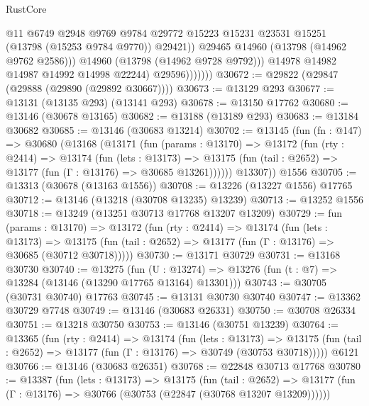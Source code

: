 \begin{lexlean}{RustCore}
\begin{coremodule}
                            @11
                            @6749
                            @2948
                            @9769
                            @9784
                            @29772
                            @15223
                            @15231
                            @23531
                            @15251
                            (@13798 (@15253 @9784 @9770))
                            @29421))
                        @29465
                        @14960
                        (@13798 (@14962 @9762 @2586)))
                      @14960
                      (@13798 (@14962 @9728 @9792)))
                    @14978
                    @14982
                    @14987
                    @14992
                    @14998
                    @22244)
                  @29596)))))))
@30672 := @29822 (@29847 (@29888 (@29890 (@29892 @30667))))
@30673 := @13129 @293
@30677 := @13131 (@13135 @293) (@13141 @293)
@30678 := @13150 @17762
@30680 := @13146 (@30678 @13165)
@30682 := @13188 (@13189 @293)
@30683 := @13184 @30682
@30685 := @13146 (@30683 @13214)
@30702 := @13145
    (fun (fn : @147) =>
    @30680
      (@13168
        (@13171
          (fun (params : @13170) =>
          @13172
            (fun (rty : @2414) =>
            @13174
              (fun (lets : @13173) =>
              @13175 (fun (tail : @2652) => @13177 (fun (Γ : @13176) => @30685 @13261))))))
        @13307))
    @1556
@30705 := @13313 (@30678 (@13163 @1556))
@30708 := @13226 (@13227 @1556) @17765
@30712 := @13146 (@13218 (@30708 @13235) @13239)
@30713 := @13252 @1556
@30718 := @13249 (@13251 @30713 @17768 @13207 @13209)
@30729 := fun (params : @13170) =>
  @13172
    (fun (rty : @2414) =>
    @13174
      (fun (lets : @13173) =>
      @13175 (fun (tail : @2652) => @13177 (fun (Γ : @13176) => @30685 (@30712 @30718)))))
@30730 := @13171 @30729
@30731 := @13168 @30730
@30740 := @13275
    (fun (U : @13274) => @13276 (fun (t : @7) => @13284 (@13146 (@13290 @17765 @13164) @13301)))
@30743 := @30705 (@30731 @30740) @17763
@30745 := @13131 @30730 @30740
@30747 := @13362 @30729 @7748
@30749 := @13146 (@30683 @26331)
@30750 := @30708 @26334
@30751 := @13218 @30750
@30753 := @13146 (@30751 @13239)
@30764 := @13365
    (fun (rty : @2414) =>
    @13174
      (fun (lets : @13173) =>
      @13175 (fun (tail : @2652) => @13177 (fun (Γ : @13176) => @30749 (@30753 @30718)))))
    @6121
@30766 := @13146 (@30683 @26351)
@30768 := @22848 @30713 @17768
@30780 := @13387
    (fun (lets : @13173) =>
    @13175
      (fun (tail : @2652) =>
      @13177 (fun (Γ : @13176) => @30766 (@30753 (@22847 (@30768 @13207 @13209))))))

\end{coremodule}
\end{lexlean}
